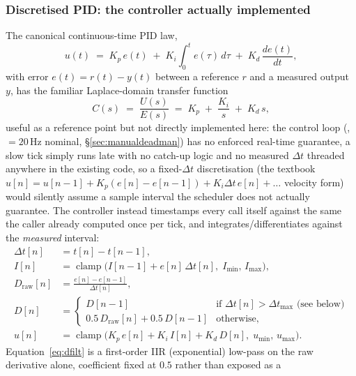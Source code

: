 \subsubsection{Discretised PID: the controller actually implemented}
\label{sec:pidmath}
The canonical continuous-time PID law,
\begin{equation}
u(t) \;=\; K_p\, e(t) \;+\; K_i \int_0^t e(\tau)\, d\tau \;+\; K_d\, \frac{d e(t)}{dt},
\label{eq:pidcontinuous}
\end{equation}
with error $e(t) = r(t) - y(t)$ between a reference $r$ and a measured
output $y$, has the familiar Laplace-domain transfer function
\begin{equation}
C(s) \;=\; \frac{U(s)}{E(s)} \;=\; K_p \;+\; \frac{K_i}{s} \;+\; K_d\, s,
\label{eq:pidtf}
\end{equation}
useful as a reference point but not directly implemented here: the
control loop (, $=20$\,Hz nominal,
\S\ref{sec:manualdeadman}) has no enforced real-time guarantee, a slow
tick simply runs late with no catch-up logic and no measured $\Delta t$
threaded anywhere in the existing code, so a fixed-$\Delta t$ discretisation
(the textbook $u[n]=u[n-1]+K_p(e[n]-e[n-1])+K_i \Delta t\, e[n]+\dots$
velocity form) would silently assume a sample interval the scheduler does
not actually guarantee. The controller instead timestamps every call
itself against the same  the caller already computed once per
tick, and integrates/differentiates against the \emph{measured} interval:
\begin{align}
\Delta t[n] &= t[n] - t[n-1], \label{eq:dt}\\
I[n] &= \operatorname{clamp}\!\big(I[n-1] + e[n]\,\Delta t[n],\; I_{\min},\, I_{\max}\big), \label{eq:integral}\\
D_{\mathrm{raw}}[n] &= \frac{e[n]-e[n-1]}{\Delta t[n]}, \label{eq:draw}\\
D[n] &= \begin{cases}
  D[n-1] & \text{if } \Delta t[n] > \Delta t_{\max} \text{ (see below)}\\
  0.5\, D_{\mathrm{raw}}[n] + 0.5\, D[n-1] & \text{otherwise,}
\end{cases} \label{eq:dfilt}\\
u[n] &= \operatorname{clamp}\!\big(K_p\, e[n] + K_i\, I[n] + K_d\, D[n],\; u_{\min},\, u_{\max}\big). \label{eq:pidout}
\end{align}
Equation~\ref{eq:dfilt} is a first-order IIR (exponential) low-pass on the
raw derivative alone, coefficient fixed at $0.5$ rather than exposed as a
